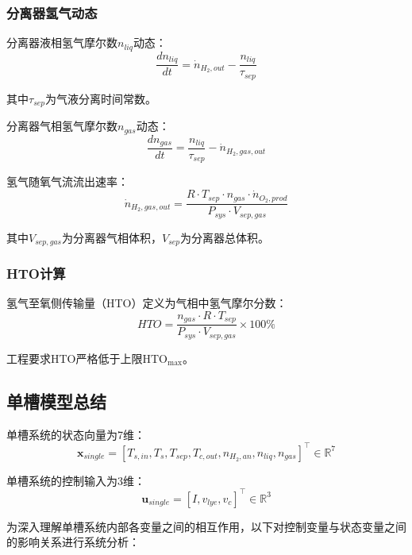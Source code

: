 \subsubsection{分离器氢气动态}

分离器液相氢气摩尔数$n_{liq}$动态：
\begin{equation}
  \frac{dn_{liq}}{dt} = \dot{n}_{H_2,out} - \frac{n_{liq}}{\tau_{sep}}
\end{equation}

其中$\tau_{sep}$为气液分离时间常数。

分离器气相氢气摩尔数$n_{gas}$动态：
\begin{equation}
  \frac{dn_{gas}}{dt} = \frac{n_{liq}}{\tau_{sep}} - \dot{n}_{H_2,gas,out}
\end{equation}

氢气随氧气流流出速率：
\begin{equation}
  \dot{n}_{H_2,gas,out} = \frac{R \cdot T_{sep} \cdot n_{gas} \cdot \dot{n}_{O_2,prod}}{P_{sys} \cdot V_{sep,gas}}
\end{equation}

其中$V_{sep,gas}$为分离器气相体积，$V_{sep}$为分离器总体积。

\subsubsection{HTO计算}

氢气至氧侧传输量（HTO）定义为气相中氢气摩尔分数：
\begin{equation}
  HTO = \frac{n_{gas} \cdot R \cdot T_{sep}}{P_{sys} \cdot V_{sep,gas}} \times 100\%
\end{equation}

工程要求HTO严格低于上限$\mathrm{HTO}_{\mathrm{max}}$。

\subsection{单槽模型总结}

单槽系统的状态向量为7维：
\begin{equation}
  \mathbf{x}_{single} = [T_{s,in}, T_s, T_{sep}, T_{c,out}, n_{H_2,an}, n_{liq}, n_{gas}]^\top \in \mathbb{R}^7
\end{equation}

单槽系统的控制输入为3维：
\begin{equation}
  \mathbf{u}_{single} = [I, v_{lye}, v_c]^\top \in \mathbb{R}^3
\end{equation}

为深入理解单槽系统内部各变量之间的相互作用，以下对控制变量与状态变量之间的影响关系进行系统分析：

